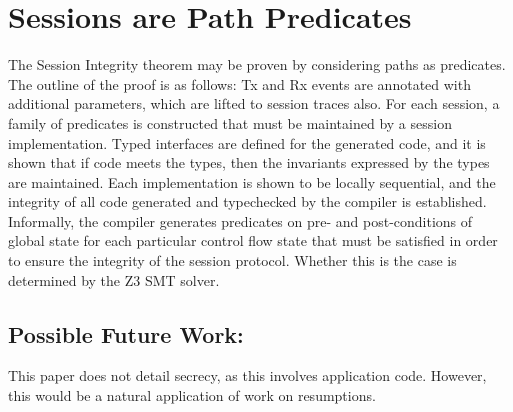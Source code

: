 \documentclass[a4paper,10pt]{article}
\begin{document}
\section{Sessions are Path Predicates}

The Session Integrity theorem may be proven by considering paths as predicates.  The outline of the
proof is as follows: Tx and Rx events are annotated with additional parameters, which are lifted to
session traces also.  For each session, a family of predicates is constructed that must be maintained
by a session implementation.  Typed interfaces are defined for the generated code, and it is shown
that if code meets the types, then the invariants expressed by the types are maintained.  Each
implementation is shown to be locally sequential, and the integrity of all code generated and
typechecked by the compiler is established.\\

Informally, the compiler generates predicates on pre- and post-conditions of global state
for each particular control flow state that must be satisfied in order to ensure the integrity of
the session protocol.  Whether this is the case is determined by the Z3 SMT solver.\\

\subsection{Possible Future Work:} This paper does not detail secrecy, as this involves application
code.  However, this would be a natural application of work on resumptions.\\
\end{document}
